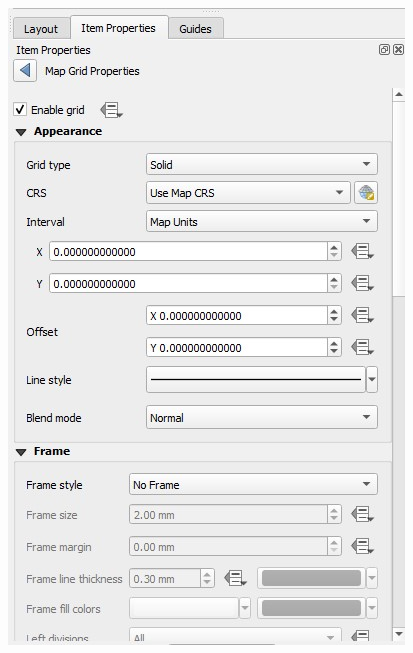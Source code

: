 \documentclass[
  letterpaper,
  DIV=11,
  numbers=noendperiod]{scrreprt}
\begin{document}
\includegraphics{images/lab_8/lab8_fig15_grid_options.jpg}
\end{document}
